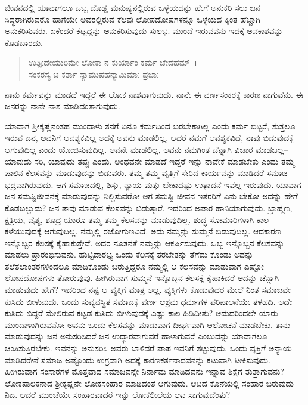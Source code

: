 ಜೀವನದಲ್ಲಿ ಯಾವಾಗಲೂ ಒಬ್ಬ ದೊಡ್ಡ ಮನುಷ್ಯನಲ್ಲಿರುವ ಒಳ್ಳೆಯದನ್ನು ಹೇಗೆ ಅನುಕರಿ ಸಲು ಜನ ಸಿದ್ಧರಾಗಿರುವರೊ ಹಾಗೆಯೇ ಅವರಲ್ಲಿರುವ ಕೆಲವು ಲೋಪದೋಷಗಳನ್ನೂ ಒಳ್ಳೆಯದ ಕ್ಕಿಂತ ಹೆಚ್ಚಾಗಿ ಅನುಕರಿಸುವರು. ಏಕೆಂದರೆ ಕೆಟ್ಟದ್ದನ್ನು ಅನುಕರಿಸುವುದು ಸುಲಭ. ಮುಂದೆ ಇರುವವನು ಇದಕ್ಕೆ ಅವಕಾಶವನ್ನು ಕೊಡಬಾರದು.

\begin{verse}
ಉತ್ಸೀದೇಯುರಿಮೇ ಲೋಕಾ ನ ಕುರ್ಯಾಂ ಕರ್ಮ ಚೇದಹಮ್~।\\ಸಂಕರಸ್ಯ ಚ ಕರ್ತಾ ಸ್ಯಾಮುಪಹನ್ಯಾಮಿಮಾಃ ಪ್ರಜಾಃ 
\end{verse}

{\small ನಾನು ಕರ್ಮವನ್ನು ಮಾಡದೆ ಇದ್ದರೆ ಈ ಲೋಕ ನಾಶವಾಗುವುದು. ನಾನೇ ಈ ವರ್ಣಸಂಕರಕ್ಕೆ ಕಾರಣ ನಾಗುವೆನು. ಈ ಜನರನ್ನು ನಾನೇ ನಾಶ ಮಾಡಿದಂತಾಗುವುದು.}

ಯಾವಾಗ ಶ‍್ರೀಕೃಷ್ಣನಂತಹ ಮುಂದಾಳು ತನಗೆ ಏನೂ ಕರ್ಮದಿಂದ ಬರಬೇಕಾಗಿಲ್ಲ ಎಂದು ಕರ್ಮ ಬಿಟ್ಟರೆ, ಸುತ್ತಲೂ ಇರುವ ಜನ, ಅವನಿಗೆ ಆವಶ್ಯಕವಿಲ್ಲ ಅದಕ್ಕೆ ಅವನು ಮಾಡಲಿಲ್ಲ, ಆದರೆ ನಮಗೆ ಆವಶ್ಯಕವಿದೆ, ನಾವು ಬಿಡುವುದಕ್ಕೆ ಆಗುವುದಿಲ್ಲ ಎಂದು ಯೋಚಿಸುವುದಿಲ್ಲ. ಅವನೇ ಮಾಡಲಿಲ್ಲ, ಅವನು ನಮಗಿಂತ ಚೆನ್ನಾಗಿ ವಿಚಾರ ಮಾಡಬಲ್ಲ–ಯಾವುದು ಸರಿ, ಯಾವುದು ತಪ್ಪು ಎಂದು. ಅಂಥವನೇ ಮಾಡದೆ ಇದ್ದರೆ ಇನ್ನು ನಾವೇಕೆ ಮಾಡಬೇಕು ಎಂದು ತಮ್ಮ ಪಾಲಿನ ಕೆಲಸವನ್ನು ಮಾಡುವುದನ್ನು ಬಿಡುವರು. ತಮ್ಮ ತಮ್ಮ ವೃತ್ತಿಗೆ ಸೇರಿದ ಕಾರ್ಯವನ್ನು ಮಾಡಿದರೆ ಸಮಾಜ ಭದ್ರವಾಗಿರುವುದು. ಆಗ ಸಮಾಜದಲ್ಲಿ, ಶಿಸ್ತು, ನ್ಯಾಯ ಮತ್ತು ಬೇಕಾದಷ್ಟು ಉತ್ಪಾದನೆ ಇವೆಲ್ಲ ಇರುವುದು. ಯಾವಾಗ ಜನ ಸಮಷ್ಟಿಜೀವನಕ್ಕೆ ಮಾಡುವುದನ್ನು ನಿಲ್ಲಿಸುವರೋ ಆಗ ಸಮಷ್ಟಿ ಜೀವನ ಇತರರಿಗೆ ಏನು ಬೇಕೋ ಅದನ್ನು ಹೇಗೆ ಕೊಡಬಲ್ಲುದು? ಜನ ತಾವು ಮಾಡುವ ಕೆಲಸವನ್ನು ಬಿಡುತ್ತಾರೆ. ಇದರಿಂದ ಅಪಾರ ಹಾನಿಯಾಗುವುದು. ಬ್ರಾಹ್ಮಣ, ಕ್ಷತ್ರಿಯ, ವೈಶ್ಯ, ಶೂದ್ರ ಯಾರೂ ತಮ್ಮ ತಮ್ಮ ಕೆಲಸವನ್ನು ಮಾಡುವುದಿಲ್ಲ. ಶುದ್ಧ ಸೋಮಾರಿಗಳಾಗಿ ಕಾಲ ಕಳೆಯುವುದಕ್ಕೆ ಆಗುವುದಿಲ್ಲ. ನಮ್ಮಲ್ಲಿ ರಜೋಗುಣವಿದೆ. ಅದು ನಮ್ಮನ್ನು ಸುಮ್ಮನೆ ಬಿಡುವುದಿಲ್ಲ. ಆದಕಾರಣ ಇನ್ನೊಬ್ಬರ ಕೆಲಸಕ್ಕೆ ಕೈಹಾಕುತ್ತೇವೆ. ಅದರ ನೂತನತೆ ನಮ್ಮನ್ನು ಆಕರ್ಷಿಸುವುದು. ಒಬ್ಬ ಇನ್ನೊಬ್ಬನ ಕೆಲಸವನ್ನು ಮಾಡಲು ಪ್ರಾರಂಭಿಸುವನು. ಹುಟ್ಟಿದಾರಭ್ಯ ಒಂದು ಕೆಲಸಕ್ಕೆ ತರಬೇತನ್ನು ತೆಗೆದು ಕೊಂಡು ಅದನ್ನು ತಲೆತಲಾಂತರಗಳಿಂದಲೂ ಮಾಡಿಕೊಂಡು ಬರುತ್ತಿದ್ದರೂ ನಮ್ಮಲ್ಲಿ ಆ ಕೆಲಸವನ್ನು ಮಾಡುವಾಗ ಎಷ್ಟೋ ಲೋಪದೋಷಗಳು ತೋರುವುವು. ಹೀಗಿರುವಾಗ ಸುಮ್ಮನೆ ಇನ್ನೊಬ್ಬನ ಕೆಲಸಕ್ಕೆ ಕೈಹಾಕಿದರೆ ಅದನ್ನು ಚೆನ್ನಾಗಿ ಮಾಡುವುದು ಹೇಗೆ? ಇದರಿಂದ ನಷ್ಟ ಆ ವ್ಯಕ್ತಿಗೆ ಮಾತ್ರ ಅಲ್ಲ. ವ್ಯಕ್ತಿಗಳು ಕೊಡುವುದರ ಮೇಲೆ ನಿಂತ ಸಮಾಜವೇ ಕುಸಿದು ಬೀಳುವುದು. ಒಂದು ಸುವ್ಯವಸ್ಥಿತ ಸಮಾಜಕ್ಕೆ ವರ್ಣ ಆಶ್ರಮ ಧರ್ಮಗಳ ಪರಿಪಾಲನೆಯೇ ತಳಹದಿ. ಅದೇ ಕುಸಿದು ಬಿದ್ದರೆ ಮೇಲಿರುವ ಕಟ್ಟಡ ಕುಸಿದು ಬೀಳುವುದಕ್ಕೆ ಎಷ್ಟು ಕಾಲ ಹಿಡಿದೀತು? ಆದುದರಿಂದಲೇ ಯಾರು ಮುಂದಾಳಾಗಿರುವನೋ ಅವನು ಒಂದು ಕೆಲಸವನ್ನು ಮಾಡುವಾಗ ದೀರ್ಘವಾಗಿ ಆಲೋಚನೆ ಮಾಡಬೇಕು. ತಾನು ಮಾಡುವುದನ್ನು ಜನ ಅನುಸರಿಸಿದರೆ ಜನ ಉದ್ಧಾರವಾಗುವರೆ ಹಾಳಾಗುವರೆ ಎಂಬುದನ್ನು ಯಾವಾಗಲೂ ಚಿಂತಿಸುತ್ತಿರಬೇಕು. ಇವನನ್ನು ಅನುಸರಿಸಿ ಅವರು ಬಾಳಿದರೆ ಪಾಪ ಇವನಿಗೆ ತಟ್ಟುವುದು. ಒಂದು ವ್ಯಕ್ತಿಗೆ ಅನ್ಯಾಯ ಮಾಡಿದರೇನೆ ಸಮಾಜ ಅಷ್ಟೊಂದು ಉಗ್ರವಾಗಿ ಅದಕ್ಕೆ ಕಾರಣಕರ್ತನಾದವನನ್ನು ಕಟುವಾಗಿ ಟೀಕಿಸುವುದು. ಹೀಗಿರುವಾಗ ಸಂಸಾರಗಳ ಮೊತ್ತವಾದ ಸಮಾಜವನ್ನೇ ನಿರ್ನಾಮ ಮಾಡಿದವನು ಇನ್ನಾವ ಶಿಕ್ಷೆಗೆ ತುತ್ತಾಗುವನು? ಲೋಕಪಾಲಕನಾದ ಶ‍್ರೀಕೃಷ್ಣನೇ ಲೋಕಸಂಹಾರ ಮಾಡಿದಂತೆ ಆಗುವುದು. ಆಟದ ಕೊನೆಯಲ್ಲಿ ಸಂಹಾರ ಬರುವುದು ನಿಜ. ಆದರೆ ಮುಂಚೆಯೇ ಸಂಹಾರವಾದರೆ ಇನ್ನು ಲೋಕಲೀಲೆಯ ಆಟ ಸಾಗುವುದೆಂತು?

